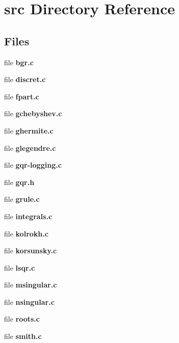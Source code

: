 \section{src Directory Reference}
\label{dir_68267d1309a1af8e8297ef4c3efbcdba}
\subsection*{Files}
\begin{DoxyCompactItemize}
\item 
file {\bfseries bgr.\+c}
\item 
file {\bfseries discret.\+c}
\item 
file {\bfseries fpart.\+c}
\item 
file {\bfseries gchebyshev.\+c}
\item 
file {\bfseries ghermite.\+c}
\item 
file {\bfseries glegendre.\+c}
\item 
file {\bfseries gqr-\/logging.\+c}
\item 
file {\bfseries gqr.\+h}
\item 
file {\bfseries grule.\+c}
\item 
file {\bfseries integrals.\+c}
\item 
file {\bfseries kolrokh.\+c}
\item 
file {\bfseries korsunsky.\+c}
\item 
file {\bfseries lsqr.\+c}
\item 
file {\bfseries msingular.\+c}
\item 
file {\bfseries nsingular.\+c}
\item 
file {\bfseries roots.\+c}
\item 
file {\bfseries smith.\+c}
\end{DoxyCompactItemize}
